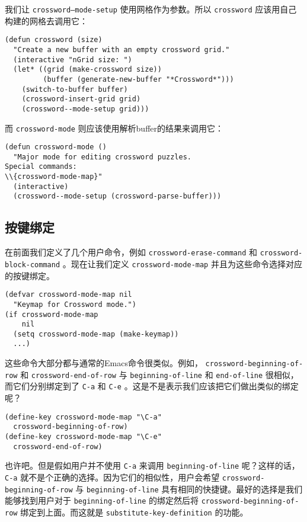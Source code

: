我们让 \texttt{crossword--mode-setup} 使用网格作为参数。所以 \texttt{crossword} 应该用自己构建的网格去调用它：

\begin{verbatim}
(defun crossword (size)
  "Create a new buffer with an empty crossword grid."
  (interactive "nGrid size: ")
  (let* ((grid (make-crossword size))
         (buffer (generate-new-buffer "*Crossword*")))
    (switch-to-buffer buffer)
    (crossword-insert-grid grid)
    (crossword--mode-setup grid)))
\end{verbatim}

而 \texttt{crossword-mode} 则应该使用解析buffer的结果来调用它：

\begin{verbatim}
(defun crossword-mode ()
  "Major mode for editing crossword puzzles.
Special commands:
\\{crossword-mode-map}"
  (interactive)
  (crossword--mode-setup (crossword-parse-buffer)))
\end{verbatim}

\subsection{按键绑定}
\label{section:10-Keybindings}

在前面我们定义了几个用户命令，例如 \texttt{crossword-erase-command} 和 \texttt{crossword-block-command} 。现在让我们定义 \texttt{crossword-mode-map} 并且为这些命令选择对应的按键绑定。

\begin{verbatim}
(defvar crossword-mode-map nil
  "Keymap for Crossword mode.")
(if crossword-mode-map
    nil
  (setq crossword-mode-map (make-keymap))
  ...)
\end{verbatim}

这些命令大部分都与通常的Emacs命令很类似。例如， \texttt{crossword-beginning-of-row} 和 \texttt{crossword-end-of-row} 与 \texttt{beginning-of-line} 和 \texttt{end-of-line} 很相似，而它们分别绑定到了 \verb|C-a| 和 \verb|C-e| 。这是不是表示我们应该把它们做出类似的绑定呢？

\begin{verbatim}
(define-key crossword-mode-map "\C-a"
  crossword-beginning-of-row)
(define-key crossword-mode-map "\C-e"
  crossword-end-of-row)
\end{verbatim}

也许吧。但是假如用户并不使用 \verb|C-a| 来调用 \texttt{beginning-of-line} 呢？这样的话， \verb|C-a| 就不是个正确的选择。因为它们的相似性，用户会希望 \texttt{crossword-beginning-of-row} 与 \texttt{beginning-of-line} 具有相同的快捷键。最好的选择是我们能够找到用户对于 \texttt{beginning-of-line} 的绑定然后将 \texttt{crossword-beginning-of-row} 绑定到上面。而这就是 \texttt{substitute-key-definition} 的功能。

